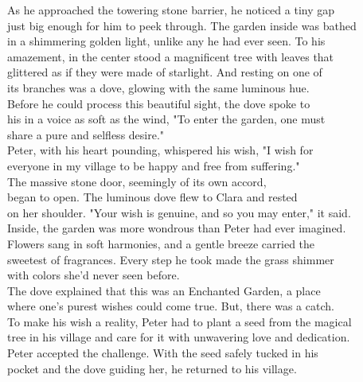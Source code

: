 \documentclass[12pt, a4paper, titlepage]{article}
\begin{document}
As he approached the towering stone barrier, he noticed a tiny gap\\ 
just big enough for him to peek through. The garden inside was bathed\\
in a shimmering golden light, unlike any he had ever seen. To his\\
amazement, in the center stood a magnificent tree with leaves that\\
glittered as if they were made of starlight. And resting on one of\\
its branches was a dove, glowing with the same luminous hue.\\


Before he could process this beautiful sight, the dove spoke to\\
his in a voice as soft as the wind, "To enter the garden, one must\\
share a pure and selfless desire."\\


Peter, with his heart pounding, whispered his wish, "I wish for\\
everyone in my village to be happy and free from suffering."\\


The massive stone door, seemingly of its own accord,\\
began to open. The luminous dove flew to Clara and rested\\
on her shoulder. "Your wish is genuine, and so you may enter," it said.\\


Inside, the garden was more wondrous than Peter had ever imagined.\\
Flowers sang in soft harmonies, and a gentle breeze carried the\\
sweetest of fragrances. Every step he took made the grass shimmer\\
with colors she'd never seen before.\\


The dove explained that this was an Enchanted Garden, a place\\
where one’s purest wishes could come true. But, there was a catch.\\
To make his wish a reality, Peter had to plant a seed from the magical\\ 
tree in his village and care for it with unwavering love and dedication.\\


Peter accepted the challenge. With the seed safely tucked in his\\
pocket and the dove guiding her, he returned to his village.\\
\end{document}
